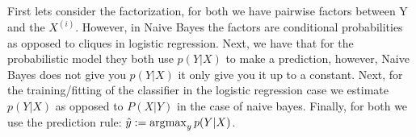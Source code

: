 First lets consider the factorization, for both we have pairwise factors between Y and the $X^{(i)}$. However, in Naive Bayes the factors are conditional probabilities as opposed to cliques in logistic regression. Next, we have that for the probabilistic model they both use $p(Y|X)$ to make a prediction, however, Naive Bayes does not give you $p(Y|X)$ it only give you it up to a constant. Next, for the training/fitting of the classifier in the logistic regression case we estimate $p(Y|X)$ as opposed to $P(X|Y)$ in the case of naive bayes. Finally, for both we use the prediction rule: $\hat{y} := \operatorname*{arg\!\max}_{y} p(Y|X)$.